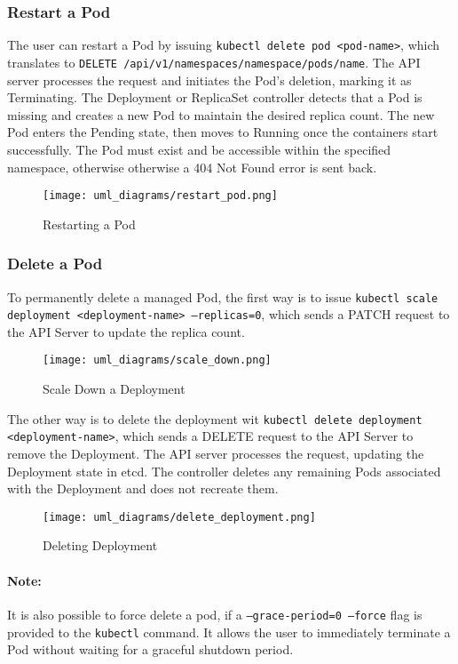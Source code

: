 \documentclass[main.tex]{subfiles}
\begin{document}
\subsubsection{Restart a Pod}
The user can restart a Pod by issuing  \texttt{kubectl delete pod <pod-name>}, which translates to \texttt{DELETE \newline /api/v1/namespaces/{namespace}/pods/{name}}. The API server processes the request and initiates the Pod’s deletion, marking it as Terminating.
The Deployment or ReplicaSet controller detects that a Pod is missing and creates a new Pod to maintain the desired replica count.
The new Pod enters the Pending state, then moves to Running once the containers start successfully.
The Pod must exist and be accessible within the specified namespace, otherwise otherwise a 404 Not Found error is sent back.
\begin{figure}[H]
    \centering
    \texttt{[image: uml\_diagrams/restart\_pod.png]}
    \caption{Restarting a Pod}
    \label{fig:create_deployment_diagram}
\end{figure}

\subsubsection{Delete a Pod}
To permanently delete a managed Pod, the first way is to issue \texttt{kubectl scale deployment <deployment-name> --replicas=0}, which sends a PATCH request to the API Server to update the replica count. 
\begin{figure}[H]
    \centering
    \texttt{[image: uml\_diagrams/scale\_down.png]}
    \caption{Scale Down a Deployment}
    \label{fig:create_deployment_diagram}
\end{figure}


The other way is to delete the deployment wit \texttt{kubectl delete deployment <deployment-name>}, which sends a DELETE request to the API Server to remove the Deployment. The API server processes the request, updating the Deployment state in etcd.
The controller deletes any remaining Pods associated with the Deployment and does not recreate them.
\begin{figure}[H]
    \centering
    \texttt{[image: uml\_diagrams/delete\_deployment.png]}
    \caption{Deleting Deployment}
    \label{fig:create_deployment_diagram}
\end{figure}

\paragraph{Note:}
It is also possible to force delete a pod, if a  \texttt{--grace-period=0 --force} flag is provided to the \texttt{kubectl} command. It allows the user to immediately terminate a Pod without waiting for a graceful shutdown period.
\end{document}
